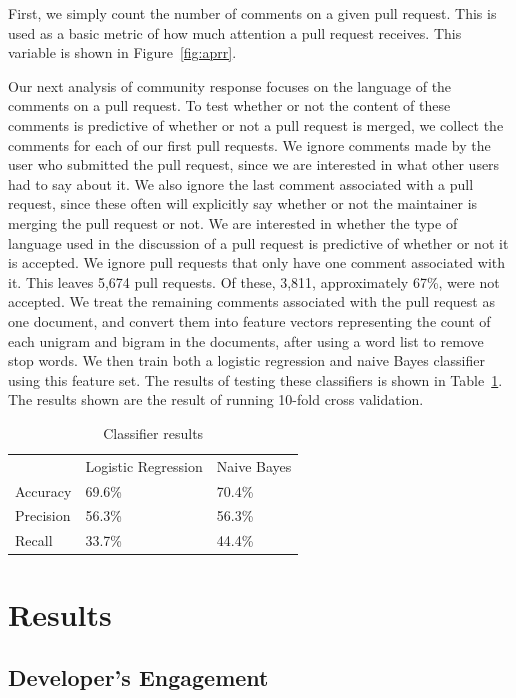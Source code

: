 \documentclass{sigchi}
\begin{document}
First, we simply count the number of comments on a given pull request. This is
used as a basic metric of how much attention a pull request receives. This
variable is shown in Figure~\ref{fig:aprr}.

Our next analysis of community response focuses on the language of the comments
on a pull request. To test whether or not the content of these comments is
predictive of whether or not a pull request is merged, we collect the comments
for each of our first pull requests. We ignore comments made by the user who
submitted the pull request, since we are interested in what other users had to
say about it. We also ignore the last comment associated with a pull request,
since these often will explicitly say whether or not the maintainer is merging
the pull request or not.  We are interested in whether the type of language used
in the discussion of a pull request is predictive of whether or not it is
accepted. We ignore pull requests that only have one comment associated with it.
This leaves 5,674 pull requests. Of these, 3,811, approximately 67\%, were not
accepted. We treat the remaining comments associated with the pull request as
one document, and convert them into feature vectors representing the count of
each unigram and bigram in the documents, after using a word list to remove stop
words. We then  train both a logistic regression and naive Bayes classifier
using this feature set. The results of testing these classifiers is shown in
Table~\ref{tbl:classifiers}. The results shown are the result of running 10-fold
cross validation.

\begin{table}[ht] \centering
  \caption{Classifier results}
  \label{tbl:classifiers}
  \begin{tabular}{lll}
  \hline\hline
  ~         & Logistic Regression & Naive Bayes \\
  Accuracy  & 69.6\%              & 70.4\%      \\
  Precision & 56.3\%              & 56.3\%      \\
  Recall    & 33.7\%              & 44.4\%      \\
  \hline
  \end{tabular}
\end{table}

\section{Results} \label{chap:results}

\subsection{Developer's Engagement} \label{results_engagement}
\end{document}
